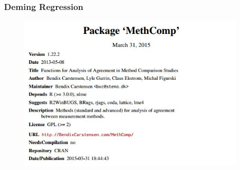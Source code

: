 \documentclass{beamer}
\begin{document}
\begin{frame}
	\frametitle{Deming Regression}
	\begin{figure}
		\centering
		\includegraphics[width=1.1\linewidth]{images/CRAN-MethComp}
		
	\end{figure}
	
\end{frame}
\end{document}
